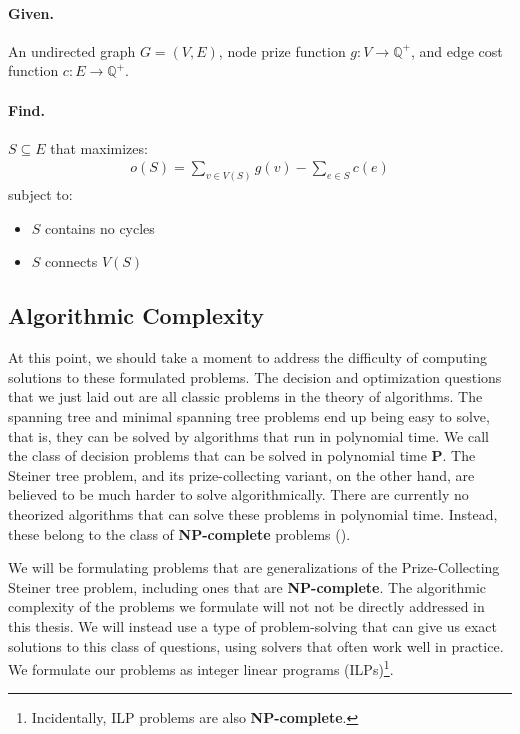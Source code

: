 \documentclass[12pt,twoside]{reedthesis}
\theoremstyle{definition}
\begin{document}
  \bigbreak

  \hfill\begin{minipage}{\dimexpr\textwidth-2cm}
  \paragraph{Given.}An undirected graph $G=(V,E)$, node prize function $g:V \rightarrow \mathbb{Q}^+$, and edge cost function $c:E \rightarrow \mathbb{Q}^+$.
  \paragraph{Find.}$S \subseteq E$ that maximizes:
  \begin{align*}
   o(S) = \sum_{v \in V(S)}g(v) - \sum_{e \in S}c(e)
  \end{align*}
  subject to:
  \begin{itemize}
    \item{$S$ contains no cycles}
    \item{$S$ connects $V(S)$}
  \end{itemize}
\xdef\tpd{\the\prevdepth}
\end{minipage}

\subsection{Algorithmic Complexity}
At this point, we should take a moment to address the difficulty of computing solutions to these formulated problems. The decision and optimization questions that we just laid out are all classic problems in the theory of algorithms. The spanning tree and minimal spanning tree problems end up being easy to solve, that is, they can be solved by algorithms that run in polynomial time. We call the class of decision problems that can be solved in polynomial time \textbf{P}. The Steiner tree problem, and its prize-collecting variant, on the other hand, are believed to be much harder to solve algorithmically. There are currently no theorized algorithms that can solve these problems in polynomial time. Instead, these belong to the class of \textbf{NP-complete} problems (\cite{Garey1979}).\par

We will be formulating problems that are generalizations of the Prize-Collecting Steiner tree problem, including ones that are \textbf{NP-complete}. The algorithmic complexity of the problems we formulate will not not be directly addressed in this thesis. We will instead use a type of problem-solving that can give us exact solutions to this class of questions, using solvers that often work well in practice. We formulate our problems as integer linear programs (ILPs)\footnote{Incidentally, ILP problems are also \textbf{NP-complete}.}.
\end{document}
